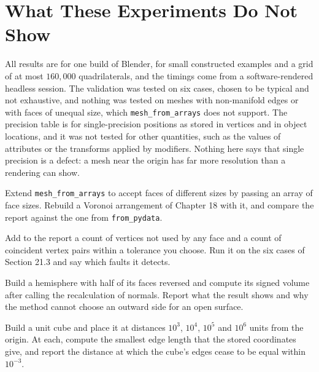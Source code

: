\section{What These Experiments Do Not Show}

All results are for one build of Blender, for small constructed examples and a grid of at most $160{,}000$ quadrilaterals, and the timings come from a software-rendered headless session. The validation was tested on six cases, chosen to be typical and not exhaustive, and nothing was tested on meshes with non-manifold edges or with faces of unequal size, which \texttt{mesh\_from\_arrays} does not support. The precision table is for single-precision positions as stored in vertices and in object locations, and it was not tested for other quantities, such as the values of attributes or the transforms applied by modifiers. Nothing here says that single precision is a defect: a mesh near the origin has far more resolution than a rendering can show.

\begin{exercise}
Extend \texttt{mesh\_from\_arrays} to accept faces of different sizes by passing an array of face sizes. Rebuild a Voronoi arrangement of Chapter 18 with it, and compare the report against the one from \texttt{from\_pydata}.
\end{exercise}

\begin{exercise}
Add to the report a count of vertices not used by any face and a count of coincident vertex pairs within a tolerance you choose. Run it on the six cases of Section 21.3 and say which faults it detects.
\end{exercise}

\begin{exercise}
Build a hemisphere with half of its faces reversed and compute its signed volume after calling the recalculation of normals. Report what the result shows and why the method cannot choose an outward side for an open surface.
\end{exercise}

\begin{exercise}
Build a unit cube and place it at distances $10^3$, $10^4$, $10^5$ and $10^6$ units from the origin. At each, compute the smallest edge length that the stored coordinates give, and report the distance at which the cube's edges cease to be equal within $10^{-3}$.
\end{exercise}
